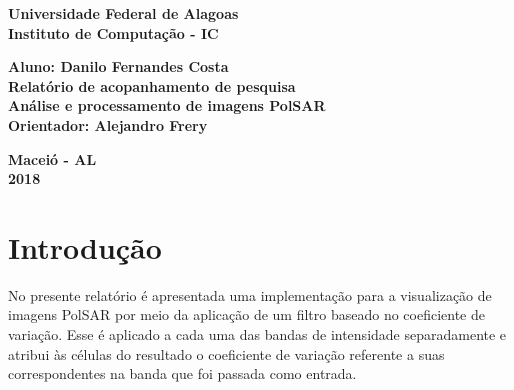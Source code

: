 \documentclass[12pt]{article}
\begin{document}
\begin{titlepage}
\begin{center}

\textbf{\LARGE Universidade Federal de Alagoas } \\[0.5cm]
\textbf{\large Instituto de Computação - IC}\\[0.2cm]

\vspace{20pt}

\vspace{20pt}
\vspace{20pt}
\vspace{20pt}
\vspace{20pt}
\vspace{20pt}
\vspace{20pt}
\vspace{20pt}
\vspace{20pt}

\textbf{\Large Aluno: Danilo Fernandes Costa}\\
\vspace{70pt}
\textbf{\LARGE Relatório de acopanhamento de pesquisa}\\
\vspace{20pt}
\textbf{\Large Análise e processamento de imagens PolSAR}\\
\vspace{70pt}
\textbf{\large Orientador: Alejandro Frery}\\

\vspace{45pt}
\end{center}

\par
\vfill
\begin{center}
\textbf{Maceió - AL}\\
\textbf{2018}
\end{center}

\end{titlepage}

\newpage

\section{Introdução}

No presente relatório é apresentada uma implementação para a visualização de imagens PolSAR por meio da aplicação de um filtro baseado no coeficiente de variação. Esse é aplicado a cada uma das bandas de intensidade separadamente e atribui às células do resultado o coeficiente de variação referente a suas correspondentes na banda que foi passada como entrada.
\end{document}
